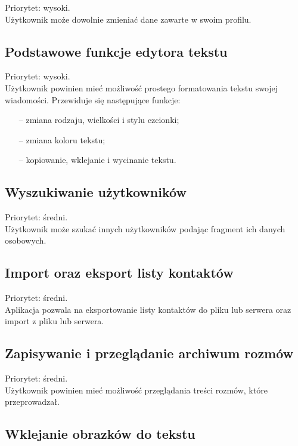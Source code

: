 \documentclass[a4paper,12pt]{article}
\begin{document}
Priorytet: wysoki.\\

Użytkownik może dowolnie zmieniać dane zawarte w swoim profilu.

\subsection[Podstawowe funkcje edytora tekstu]{Podstawowe funkcje edytora tekstu}

Priorytet: wysoki.\\

Użytkownik powinien mieć możliwość prostego formatowania tekstu swojej wiadomości.
Przewiduje się następujące funkcje:
\begin{itemize}
    \item[--] zmiana rodzaju, wielkości i stylu czcionki;
    \item[--] zmiana koloru tekstu;
    \item[--] kopiowanie, wklejanie i wycinanie tekstu.
\end{itemize}

\subsection[Wyszukiwanie użytkowników]{Wyszukiwanie użytkowników}
Priorytet: średni.\\

Użytkownik może szukać innych użytkowników podając fragment ich danych osobowych.
\subsection[Import oraz eksport listy kontaktów]{Import oraz eksport listy kontaktów}

Priorytet: średni.\\

Aplikacja pozwala na eksportowanie listy kontaktów do pliku lub serwera oraz import z pliku lub serwera.
\subsection[Zapisywanie i przeglądanie archiwum rozmów]{Zapisywanie i przeglądanie archiwum rozmów}
Priorytet: średni.\\

Użytkownik powinien mieć możliwość przeglądania treści rozmów, które przeprowadzał.

\subsection[Wklejanie obrazków do tekstu]{Wklejanie obrazków do tekstu}
\end{document}
